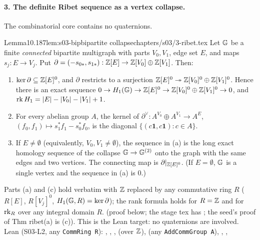 \paragraph{3. The definite Ribet sequence as a vertex collapse.} The combinatorial core contains no quaternions.

\begin{quoted}{Lemma}{10.1}{87}{lem:s03-bip}{bipartite collapse}{chapters/s03/3-ribet.tex}\label{rpt:lem:s03-bip}
Let $\mathbb{G}$ be a finite \emph{connected} bipartite multigraph with parts $V_0,V_1$, edge set $E$, and maps $s_j:E\to V_j$. Put
$\partial=(-s_{0*},s_{1*}):\mathbb{Z}[E]\to\mathbb{Z}[V_0]\oplus\mathbb{Z}[V_1]$. Then:
\begin{enumerate}[label=(\alph*)]
\item $\ker\partial\subseteq\mathbb{Z}[E]^0$, and $\partial$ restricts to a surjection $\mathbb{Z}[E]^0\twoheadrightarrow\mathbb{Z}[V_0]^0\oplus\mathbb{Z}[V_1]^0$.
  Hence there is an exact sequence $0\to H_1(\mathbb{G})\to\mathbb{Z}[E]^0\to\mathbb{Z}[V_0]^0\oplus\mathbb{Z}[V_1]^0\to0$, and $\operatorname{rk} H_1=|E|-|V_0|-|V_1|+1$.
\item For every abelian group $A$, the kernel of $\partial^\vee:A^{V_0}\oplus A^{V_1}\to A^E$, $(f_0,f_1)\mapsto s_1^*f_1-s_0^*f_0$, is
  the diagonal $\{(c\mathbf1,c\mathbf1):c\in A\}$.
\item If $E\ne\emptyset$ (equivalently, $V_0,V_1\ne\emptyset$), the sequence in (a) is the long exact homology sequence of the collapse
  $\mathbb{G}\to\mathbb{G}^{(2)}$ onto the graph with the same edges and two vertices. The connecting map is $\partial|_{\mathbb{Z}[E]^0}$. (If $E=\emptyset$, $\mathbb{G}$ is a
  single vertex and the sequence in (a) is $0$.)
\end{enumerate}
Parts (a) and (c) hold verbatim with $\mathbb{Z}$ replaced by any commutative ring $R$ ($R[E]$, $R[V_j]^0$, $H_1(\mathbb{G},R)=\ker\partial$); the rank formula holds
for $R=\mathbb{Z}$ and for $\operatorname{rk}_R$ over any integral domain $R$. \stproved{} (proof below; the stage tex has \sttoprove; the seed's proof of Thm ribet(a)
is (c)). This is the Lean target: no quaternions are involved. Lean (S03-L2, any \texttt{CommRing R}): , , ,  (over $\mathbb{Z}$),  (any \texttt{AddCommGroup A}), , ,  \stformal{}
\end{quoted}
